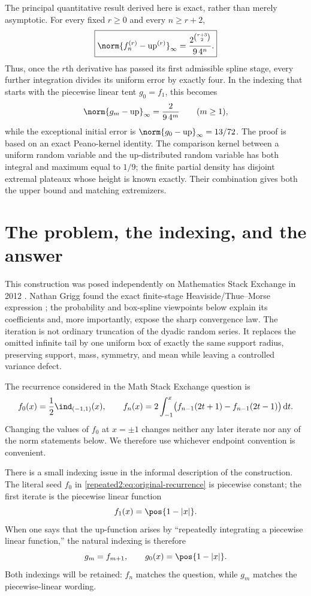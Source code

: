 \documentclass[11pt,oneside]{article}
\theoremstyle{definition}
\theoremstyle{remark}
\newcommand{\Up}{\operatorname{up}}
\newcommand{\dd}{\,\mathrm d}
\begin{document}
The principal quantitative result derived here is exact, rather than merely asymptotic.  For every
fixed $r\ge0$ and every $n\ge r+2$,
\[
 \boxed{\displaystyle
 \norm{f_n^{(r)}-\Up^{(r)}}_\infty
 =\frac{2^{\binom{r+3}{2}}}{9\,4^n}.}
\]
Thus, once the $r$th derivative has passed its first admissible spline stage, every further
integration divides its uniform error by exactly four.  In the indexing that starts with the
piecewise linear tent $g_0=f_1$, this becomes
\[
 \norm{g_m-\Up}_\infty=\frac{2}{9\,4^m}\qquad(m\ge1),
\]
while the exceptional initial error is $\norm{g_0-\Up}_\infty=13/72$.
The proof is based on an exact Peano-kernel identity.  The comparison kernel between a
uniform random variable and the up-distributed random variable has both integral and
maximum equal to $1/9$; the finite partial density has disjoint extremal plateaux whose
height is known exactly.  Their combination gives both the upper bound and matching
extremizers.


\section{The problem, the indexing, and the answer}
\label{repeated2:sec:introduction}

This construction was posed independently on Mathematics Stack Exchange in 2012
\cite{repeated2:mse-question}.  Nathan Grigg found the exact finite-stage
Heaviside/Thue--Morse expression \cite{repeated2:mse-answer}; the probability and
box-spline viewpoints below explain its coefficients and, more importantly, expose the
sharp convergence law.  The iteration is not ordinary truncation of the dyadic random
series.  It replaces the omitted infinite tail by one uniform box of exactly the same
support radius, preserving support, mass, symmetry, and mean while leaving a controlled
variance defect.

The recurrence considered in the Math Stack Exchange question
\cite{repeated2:mse-question,repeated2:mse-answer} is
\begin{equation}
 f_0(x)=\frac12\ind_{(-1,1)}(x),
 \qquad
 f_n(x)=2\int_{-1}^{x}
 \bigl(f_{n-1}(2t+1)-f_{n-1}(2t-1)\bigr)\dd t.
 \label{repeated2:eq:original-recurrence}
\end{equation}
Changing the values of $f_0$ at $x=\pm1$ changes neither any later iterate nor any of the
norm statements below.  We therefore use whichever endpoint convention is convenient.

There is a small indexing issue in the informal description of the construction.  The
literal seed $f_0$ in \eqref{repeated2:eq:original-recurrence} is piecewise constant; the first iterate
is the piecewise linear function
\begin{equation}
 f_1(x)=\pos{1-|x|}.
 \label{repeated2:eq:tent}
\end{equation}
When one says that the up-function arises by ``repeatedly integrating a piecewise linear
function,'' the natural indexing is therefore
\begin{equation}
 g_m=f_{m+1},\qquad g_0(x)=\pos{1-|x|}.
 \label{repeated2:eq:linear-indexing}
\end{equation}
Both indexings will be retained: $f_n$ matches the question, while $g_m$ matches the
piecewise-linear wording.
\end{document}
